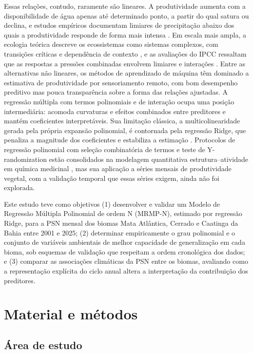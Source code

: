 \documentclass[a4paper,fleqn]{cas-sc}
\begin{document}
Essas relações, contudo, raramente são lineares. A produtividade aumenta com a disponibilidade de água apenas até determinado ponto, a partir do qual satura ou declina, e estudos empíricos documentam limiares de precipitação abaixo dos quais a produtividade responde de forma mais intensa \citep{jin2018,linger2020,mwangi2025}. Em escala mais ampla, a ecologia teórica descreve os ecossistemas como sistemas complexos, com transições críticas e dependência de contexto \citep{levin1998,flores2024}, e as avaliações do IPCC ressaltam que as respostas a pressões combinadas envolvem limiares e interações \citep{ipcc2022}. Entre as alternativas não lineares, os métodos de aprendizado de máquina têm dominado a estimativa de produtividade por sensoriamento remoto, com bom desempenho preditivo mas pouca transparência sobre a forma das relações ajustadas. A regressão múltipla com termos polinomiais e de interação ocupa uma posição intermediária: acomoda curvaturas e efeitos combinados entre preditores e mantém coeficientes interpretáveis. Sua limitação clássica, a multicolinearidade gerada pela própria expansão polinomial, é contornada pela regressão Ridge, que penaliza a magnitude dos coeficientes e estabiliza a estimação \citep{hoerl1970}. Protocolos de regressão polinomial com seleção combinatória de termos e teste de Y-randomization estão consolidados na modelagem quantitativa estrutura--atividade em química medicinal \citep{guimaraes2024}, mas sua aplicação a séries mensais de produtividade vegetal, com a validação temporal que essas séries exigem, ainda não foi explorada.

Este estudo teve como objetivos (1) desenvolver e validar um Modelo de Regressão Múltipla Polinomial de ordem N (MRMP-N), estimado por regressão Ridge, para a PSN mensal dos biomas Mata Atlântica, Cerrado e Caatinga da Bahia entre 2001 e 2025; (2) determinar empiricamente o grau polinomial e o conjunto de variáveis ambientais de melhor capacidade de generalização em cada bioma, sob esquemas de validação que respeitam a ordem cronológica dos dados; e (3) comparar as associações climáticas da PSN entre os biomas, avaliando como a representação explícita do ciclo anual altera a interpretação da contribuição dos preditores.

\section{Material e métodos}\label{sec:methods}

\subsection{Área de estudo}
\end{document}
